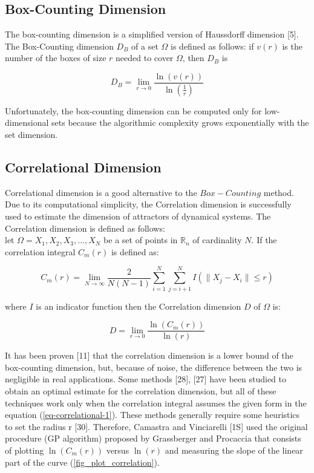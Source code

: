 \documentclass[journal]{IEEEtran}
\begin{document}
\subsection{Box-Counting Dimension}
The box-counting dimension is a simplified version of Haussdorff dimension [5]. 
The Box-Counting dimension \(D_B\) of a set \(\Omega\) is defined as follows:
if \(v(r)\) is the number of the boxes of size \(r\) needed to cover \(\Omega\), then \(D_B\) is

\begin{equation}
  \label{eq-box-counting}
  D_B = \lim_{r\to 0}\frac{\ln(v(r))}{\ln(\frac{1}{r})}
\end{equation}

Unfortunately, the box-counting dimension can be computed only
for low-dimensional sets because the algorithmic complexity grows
exponentially with the set dimension.

\subsection{Correlational Dimension}

Correlational dimension is a good alternative to the \(Box-Counting\) method. Due to its computational simplicity, the Correlation dimension
is successfully used to estimate the dimension of attractors of dynamical systems.
The Correlation dimension is defined as follows:\\
let \(\Omega = X_1, X_2, X_3,...,X_N\)  be a set of points in \(\mathbb{R}_n\) of cardinality \(N\). 
If the correlation integral \(C_m(r)\) is defined as:


\begin{equation}
  \label{eq-correlational-1}
  C_m(r) = \lim_{N\to \infty}\frac{2}{N(N-1)}\sum_{i=1}^N\sum_{j=i+1}^N I(\parallel X_j - X_i \parallel \leq r) 
\end{equation}

where \(I\) is an indicator function then the Correlation dimension \(D\) of \(\Omega\) is:

\begin{equation}
  \label{eq-correlational-2}
  D = \lim_{r\to 0}\frac{\ln(C_m(r))}{\ln(r)}
\end{equation}

It has been proven [11] that the correlation dimension is a lower bound of the box-counting dimension, but, because of noise, 
the difference between the two is negligible in real applications.  
Some methods [28], [27] have been studied to obtain an optimal estimate for the correlation dimension, but all of these 
techniques work only when the correlation integral assumes the given form in the equation (\ref{eq-correlational-1}).
These methods generally require some heuristics to set the radius r [30].
Therefore, Camastra and Vinciarelli [1S] used the original procedure (GP algorithm) proposed by Grassberger and Procaccia 
that consists of plotting \(\ln(C_m(r))\) versus \(\ln(r)\) and measuring the slope of the linear part of
the curve (\ref{fig_plot_correlation}).
\end{document}
